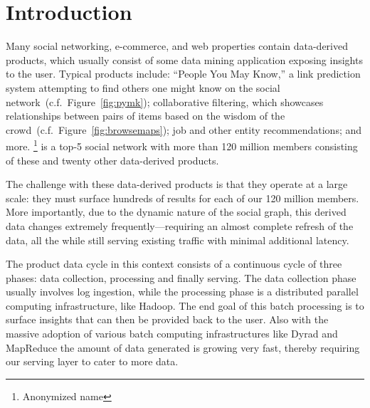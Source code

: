 \section{Introduction}
\label{sec:introduction}

Many social networking, e-commerce, and web properties contain
data-derived products, which usually consist of some data mining
application exposing insights to the user. Typical products include:
``People You May Know,'' a link prediction system attempting to find
others one might know on the social
network~(c.f.~Figure~\ref{fig:pymk}); collaborative filtering, which
showcases relationships between pairs of items based on the wisdom of
the crowd~(c.f.~Figure~\ref{fig:browsemaps}); job and other entity
recommendations; and more. \linkedin\footnote{Anonymized name} is a
top-5 social network with more than 120 million members consisting of
these and twenty other data-derived products. 

The challenge with these data-derived products is that they operate at
a large scale: they must surface hundreds of results for each of our
120 million members. More importantly, due to the dynamic nature of
the social graph, this derived data changes extremely
frequently---requiring an almost complete refresh of the data, all the
while still serving existing traffic with minimal additional latency.

The product data cycle in this context consists of a continuous cycle
of three phases: data collection, processing and finally serving. The
data collection phase usually involves log ingestion, while the
processing phase is a distributed parallel computing infrastructure,
like Hadoop. The end goal of this batch processing is to surface
insights that can then be provided back to the user. Also with the 
massive adoption of various batch computing infrastructures like 
Dyrad\cite{dyrad} and MapReduce\cite{dean} the amount of data generated 
is growing very fast, thereby requiring our serving layer to cater 
to more data. 

